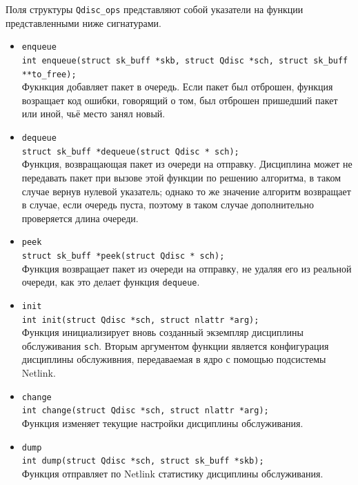 	Поля структуры \lstinline{Qdisc_ops} представляют собой указатели на функции 
	представленными ниже сигнатурами.
	\begin{itemize}
		\item \lstinline{enqueue}\\
   		    \lstinline{int enqueue(struct sk_buff *skb, struct Qdisc *sch, struct sk_buff **to_free);} \\
			Фукнкция добавляет пакет в очередь. Если пакет был отброшен, функция
			возращает код ошибки, говорящий о том, был отброшен пришедший пакет или
			иной, чьё место занял новый.
		\item \lstinline{dequeue}\\
			\lstinline{struct sk_buff *dequeue(struct Qdisc * sch);} \\
			Функция, возвращающая пакет из очереди на отправку. Дисциплина
			может не передавать пакет при вызове этой функции по решению
			алгоритма, в таком случае вернув нулевой указатель; 
			однако то же значение алгоритм возвращает в случае, если очередь
			пуста, поэтому в таком случае дополнительно проверяется длина
			очереди.
		\item \lstinline{peek}\\
			\lstinline{struct sk_buff *peek(struct Qdisc * sch);}\\
			Функция возвращает пакет из очереди на отправку, не удаляя его из реальной очереди,
			как это делает функция \lstinline{dequeue}.
		\item \lstinline{init}\\
			  \lstinline{int init(struct Qdisc *sch, struct nlattr *arg);}\\
			  Функция инициализирует вновь созданный экземпляр дисциплины обслуживания \texttt{sch}.
			  Вторым аргументом функции является конфигурация дисциплины обслуживния, передаваемая
			  в ядро с помощью подсистемы Netlink.
		\item \lstinline{change}\\
			  \lstinline{int change(struct Qdisc *sch, struct nlattr *arg);}\\
			  Функция изменяет текущие настройки дисциплины обслуживания. 
		\item \lstinline{dump}\\
			  \lstinline{int dump(struct Qdisc *sch, struct sk_buff *skb);}\\
			  Функция отправляет по Netlink статистику дисциплины обслуживания.
	\end{itemize}

